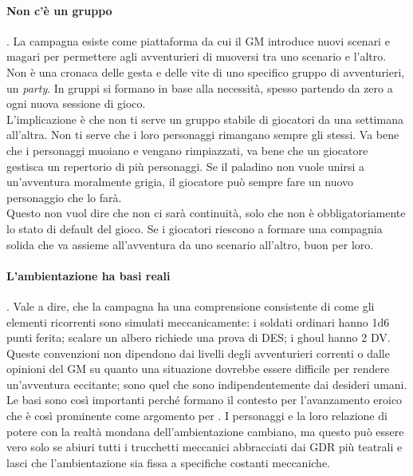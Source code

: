 \paragraph{Non c'è un gruppo}. La campagna esiste come piattaforma da cui il GM introduce nuovi scenari e magari per permettere agli avventurieri di muoversi tra uno scenario e l'altro. Non è una cronaca delle gesta e delle vite di uno specifico gruppo di avventurieri, un \textit{party}. In gruppi si formano in base alla necessità, spesso partendo da zero a ogni nuova sessione di gioco.\\
L'implicazione è che non ti serve un gruppo stabile di giocatori da una settimana all'altra. Non ti serve che i loro personaggi rimangano sempre gli stessi. Va bene che i personaggi muoiano e vengano rimpiazzati, va bene che un giocatore gestisca un repertorio di più personaggi. Se il paladino non vuole unirsi a un'avventura moralmente grigia, il giocatore può sempre fare un nuovo personaggio che lo farà.\\
Questo non vuol dire che non ci sarà continuità, solo che non è obbligatoriamente lo stato di default del gioco. Se i giocatori riescono a formare una compagnia solida che va assieme all'avventura da uno scenario all'altro, buon per loro.

\paragraph{L'ambientazione ha basi reali}. Vale a dire, che la campagna ha una comprensione consistente di come gli elementi ricorrenti sono simulati meccanicamente: i soldati ordinari hanno 1d6 punti ferita; scalare un albero richiede una prova di DES; i ghoul hanno 2 DV. Queste convenzioni non dipendono dai livelli degli avventurieri correnti o dalle opinioni del GM su quanto una situazione dovrebbe essere difficile per rendere un'avventura eccitante; sono quel che sono indipendentemente dai desideri umani.\\
Le basi sono così importanti perché formano il contesto per l'avanzamento eroico che è così prominente come argomento per \dnd. I personaggi e la loro relazione di potere con la realtà mondana dell'ambientazione cambiano, ma questo può essere vero solo se abiuri tutti i trucchetti meccanici abbracciati dai GDR più teatrali e lasci che l'ambientazione sia fissa a specifiche costanti meccaniche.


